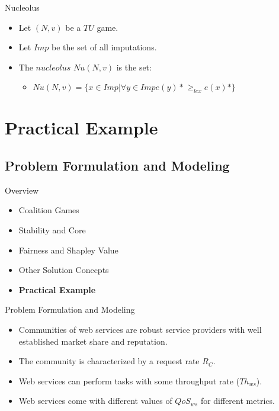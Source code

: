 \documentclass{beamer}
\begin{document}
\begin{frame}{Nucleolus}
    \begin{itemize}
        \item Let $(N,v)$ be a $TU$ game.
        \item Let $Imp$ be the set of all imputations.
        \item The {\color{blue}$nucleolus$ $Nu(N,v)$} is the set:
        \begin{itemize}
            \item $Nu(N,v) = \{x \in Imp|\forall y \in Imp e(y)* \geq_{lex} e(x)*\}$
        \end{itemize}
    \end{itemize}
\end{frame}







\section{Practical Example}
\subsection{Problem Formulation and Modeling}


\begin{frame}{Overview}
    \begin{itemize}
     	\itemsep=.5cm
    	\item Coalition Games
    	\item Stability and Core
    	\item Fairness and Shapley Value
    	\item Other Solution Conecpts
        \item {\bf Practical Example}
    \end{itemize}
\end{frame}


\begin{frame}{Problem Formulation and Modeling}
    \begin{itemize}
        \item Communities of web services are robust service providers with well established market share and reputation.
        \item The community is characterized by a request rate $R_C$.
        \item Web services can perform tasks with some throughput rate ($Th_{ws}$).
        \item Web services come with different values of $QoS_{ws}$ for different metrics.
    \end{itemize}
\end{frame}
\end{document}
